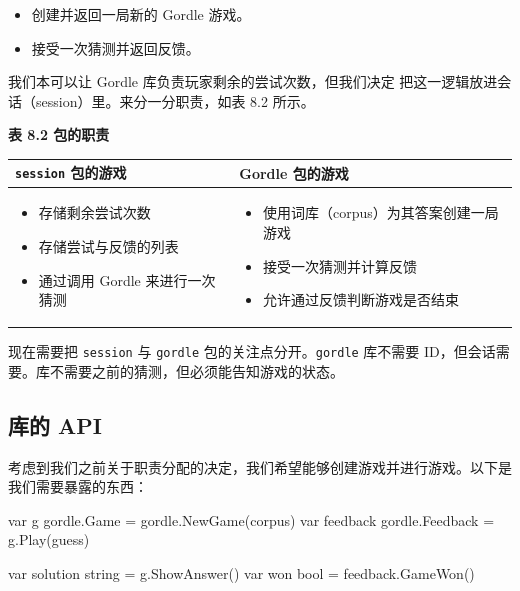 \begin{itemize}
  \item 创建并返回一局新的 Gordle 游戏。
  \item 接受一次猜测并返回反馈。
\end{itemize}

我们本可以让 Gordle 库负责玩家剩余的尝试次数，但我们决定
把这一逻辑放进会话（session）里。来分一分职责，如表 8.2 所示。

\medskip
\noindent\textbf{表 8.2 包的职责}

\begin{center}
\small
\begin{tabularx}{\textwidth}{|X|X|}
\hline
\textbf{\texttt{session} 包的游戏} & \textbf{Gordle 包的游戏} \\
\hline
\begin{itemize}[leftmargin=1.5em,itemsep=0.1em,topsep=0.2em]
  \item 存储剩余尝试次数
  \item 存储尝试与反馈的列表
  \item 通过调用 Gordle 来进行一次猜测
\end{itemize}
&
\begin{itemize}[leftmargin=1.5em,itemsep=0.1em,topsep=0.2em]
  \item 使用词库（corpus）为其答案创建一局游戏
  \item 接受一次猜测并计算反馈
  \item 允许通过反馈判断游戏是否结束
\end{itemize}
\\
\hline
\end{tabularx}
\end{center}

现在需要把 \texttt{session} 与 \texttt{gordle} 包的关注点分开。\texttt{gordle} 库不需要 ID，但会话需要。库不需要之前的猜测，但必须能告知游戏的状态。

\subsection{库的 API}

考虑到我们之前关于职责分配的决定，我们希望能够创建游戏并进行游戏。以下是我们需要暴露的东西：

\begin{gocode}[]
var g gordle.Game = gordle.NewGame(corpus)
var feedback gordle.Feedback = g.Play(guess)

var solution string = g.ShowAnswer()
var won bool = feedback.GameWon()
\end{gocode}

